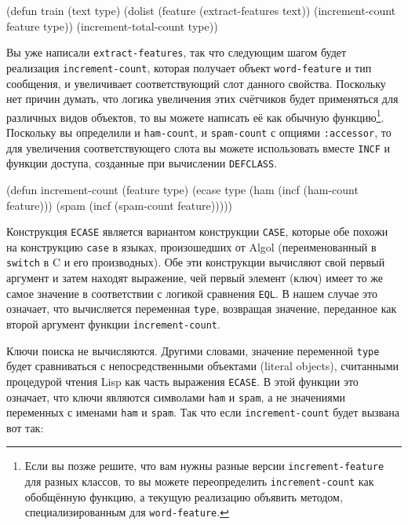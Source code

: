 \begin{myverb}
(defun train (text type)
  (dolist (feature (extract-features text))
    (increment-count feature type))
  (increment-total-count type))
\end{myverb}

Вы уже написали \lstinline{extract-features}, так что следующим шагом будет реализация
\lstinline{increment-count}, которая получает объект \lstinline{word-feature} и тип сообщения, и
увеличивает соответствующий слот данного свойства.  Поскольку нет причин думать, что
логика увеличения этих счётчиков будет применяться для различных видов объектов, то вы
можете написать её как обычную функцию\footnote{Если вы позже решите, что вам нужны
  разные версии \lstinline{increment-feature} для разных классов, то вы можете переопределить
  \lstinline{increment-count} как обобщённую функцию, а текущую реализацию объявить методом,
  специализированным для \lstinline{word-feature}.}.  Поскольку вы определили и \lstinline{ham-count},
и \lstinline{spam-count} с опциями \lstinline{:accessor}, то для увеличения соответствующего слота
вы можете использовать вместе \lstinline{INCF} и функции доступа, созданные при вычислении
\lstinline{DEFCLASS}.

\begin{myverb}
(defun increment-count (feature type)
  (ecase type
    (ham (incf (ham-count feature)))
    (spam (incf (spam-count feature)))))
\end{myverb}

Конструкция \lstinline{ECASE} является вариантом конструкции \lstinline{CASE}, которые обе похожи на
конструкцию \lstinline{case} в языках, произошедших от Algol (переименованный в \lstinline{switch} в
C и его производных).  Обе эти конструкции вычисляют свой первый аргумент и затем находят
выражение, чей первый элемент (ключ) имеет то же самое значение в соответствии с логикой
сравнения \lstinline{EQL}.  В нашем случае это означает, что вычисляется переменная
\lstinline{type}, возвращая значение, переданное как второй аргумент функции
\lstinline{increment-count}.

Ключи поиска не вычисляются.  Другими словами, значение переменной \lstinline{type} будет
сравниваться с непосредственными объектами (literal objects), считанными процедурой чтения
Lisp как часть выражения \lstinline{ECASE}. В этой функции это означает, что ключи являются
символами \lstinline{ham} и \lstinline{spam}, а не значениями переменных с именами \lstinline{ham} и
\lstinline{spam}.  Так что если \lstinline{increment-count} будет вызвана вот так:

